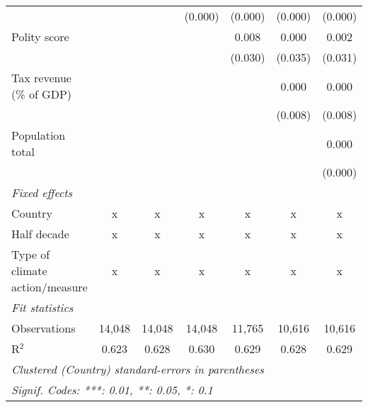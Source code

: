\begin{tabular}{lcccccc}
                                                                                        &         &                & (0.000)        & (0.000)        & (0.000)        & (0.000)\\   
   Polity score                                                                         &         &                &                & 0.008          & 0.000          & 0.002\\   
                                                                                        &         &                &                & (0.030)        & (0.035)        & (0.031)\\   
   Tax revenue (\% of GDP)                                                              &         &                &                &                & 0.000          & 0.000\\   
                                                                                        &         &                &                &                & (0.008)        & (0.008)\\   
   Population total                                                                     &         &                &                &                &                & 0.000\\   
                                                                                        &         &                &                &                &                & (0.000)\\   
   \emph{Fixed effects}\\
   Country                                                                              & x       & x              & x              & x              & x              & x\\  
   Half decade                                                                          & x       & x              & x              & x              & x              & x\\  
   Type of climate action/measure                                                       & x       & x              & x              & x              & x              & x\\  
   \midrule \emph{Fit statistics}\\
   Observations                                                                         & 14,048  & 14,048         & 14,048         & 11,765         & 10,616         & 10,616\\  
   R$^2$                                                                                & 0.623   & 0.628          & 0.630          & 0.629          & 0.628          & 0.629\\  
   \midrule
   \multicolumn{7}{l}{\emph{Clustered (Country) standard-errors in parentheses}}\\
   \multicolumn{7}{l}{\emph{Signif. Codes: ***: 0.01, **: 0.05, *: 0.1}}\\
\end{tabular}
\par\endgroup


